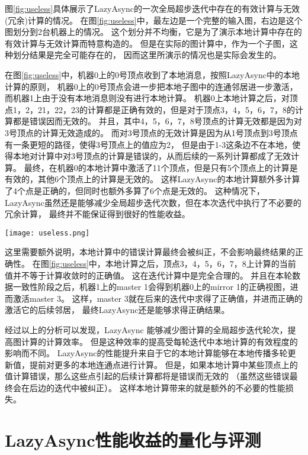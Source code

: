 图\ref{fig:useless}具体展示了LazyAsync的一次全局超步迭代中存在的有效计算与无效(冗余)计算的情况。
在图\ref{fig:useless}中，最左边是一个完整的输入图，右边是这个图划分到2台机器上的情况。
这个划分并不均衡，它是为了演示本地计算中存在的有效计算与无效计算而特意构造的。
但是在实际的图计算中，作为一个子图，这种划分结果是完全可能存在的，
因而这里所演示的情况也是实际会发生的。

在图\ref{fig:useless}中，机器0上的0号顶点收到了本地消息，按照LazyAsync中的本地计算的原则，
机器0上的0号顶点会进一步把本地子图中的连通邻居进一步激活，而机器1上由于没有本地消息则没有进行本地计算。
机器0上本地计算之后，对顶点1，2，21，22，23的计算都是正确有效的，但是对于顶点3，4，5，6，7，8的计算都是错误因而无效的。
并且，其中4，5，6，7，8号顶点的计算无效都是因为对3号顶点的计算无效造成的。
而对3号顶点的无效计算是因为从1号顶点到3号顶点有一条更短的路径，使得3号顶点上的值应为2，
但是由于1-3这条边不在本地，使得本地对计算中对3号顶点的计算是错误的，从而后续的一系列计算都成了无效计算。
最终，在机器0的本地计算中激活了11个顶点，但是只有5个顶点上的计算是有效的，其他6个顶点上的计算是无效的。
这样LazyAsync的本地计算额外多计算了4个点是正确的，但同时也额外多算了6个点是无效的。
这种情况下，LazyAsync虽然还是能够减少全局超步迭代次数，但在本次迭代中执行了不必要的冗余计算，
最终并不能保证得到很好的性能收益。

\begin{center}
  \texttt{[image: useless.png]}
  \label{fig:useless}
\end{center}  

这里需要额外说明，本地计算中的错误计算最终会被纠正，不会影响最终结果的正确性。
在图\ref{fig:useless}中，本地计算之后，顶点3，4，5，6，7，8上计算的当前值并不等于计算收敛时的正确值。
这在迭代计算中是完全合理的。
并且在本轮数据一致性阶段之后，机器1上的master 1会得到机器0上的mirror 1的正确视图，进而激活master 3。
这样，master 3就在后来的迭代中求得了正确值，并进而正确的激活它的后续邻居，
最终LazyAsync还是能够求得正确结果。

经过以上的分析可以发现，LazyAsync 能够减少图计算的全局超步迭代轮次，提高图计算的计算效率。
但是这种效率的提高受每轮迭代中本地计算的有效程度的影响而不同。
LazyAsync的性能提升来自于它的本地计算能够在本地传播多轮更新值，提前对更多的本地连通点进行计算。
但是，如果本地计算中某些顶点上的值计算错误，那么这些点引起的后续计算都将是错误而无效的
（虽然这些错误最终会在后边的迭代中被纠正）。
这样本地计算带来的就是额外的不必要的性能损失。


\section{LazyAsync性能收益的量化与评测}  

